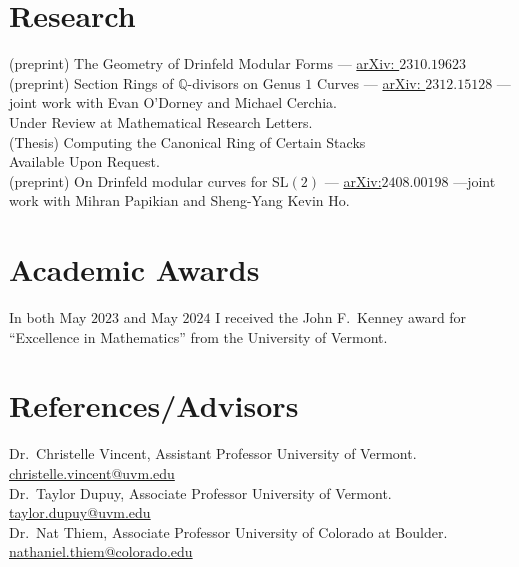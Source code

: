 \documentclass[letterpaper]{article}
\begin{document}
	\section*{Research}

	\noindent (preprint) The Geometry of Drinfeld Modular Forms --- \href{https://arxiv.org/abs/2310.19623}{arXiv: $2310.19623$}\\
	
	\noindent (preprint) Section Rings of $\mathbb{Q}$-divisors on Genus $1$ Curves --- \href{https://arxiv.org/abs/2312.15128}{arXiv: $2312.15128$} --- joint work with Evan O'Dorney and Michael Cerchia.\\
	Under Review at Mathematical Research Letters.\\
	
	\noindent (Thesis) Computing the Canonical Ring of Certain Stacks\\
	Available Upon Request.\\
	
	\noindent (preprint) On Drinfeld modular curves for SL$(2)$ --- \href{https://arxiv.org/abs/2408.00198#}{arXiv:$2408.00198$} ---joint work with Mihran Papikian and Sheng-Yang Kevin Ho.

	
	\section*{Academic Awards}
	In both May $2023$ and May $2024$ I received the John F.\ Kenney award for ``Excellence in Mathematics'' from the University of Vermont. 
	
	\section*{References/Advisors}
	\noindent Dr.\ Christelle Vincent, Assistant Professor University of Vermont. \href{mailto:christelle.vincent@uvm.edu}{christelle.vincent@uvm.edu}\\
	\noindent Dr.\ Taylor Dupuy, Associate Professor University of Vermont. \href{mailto:taylor.dupuy@uvm.edu}{taylor.dupuy@uvm.edu}\\
	\noindent Dr.\ Nat Thiem, Associate Professor University of Colorado at Boulder.  \href{mailto:nathaniel.thiem@colorado.edu}{nathaniel.thiem@colorado.edu}
	
\end{document}
